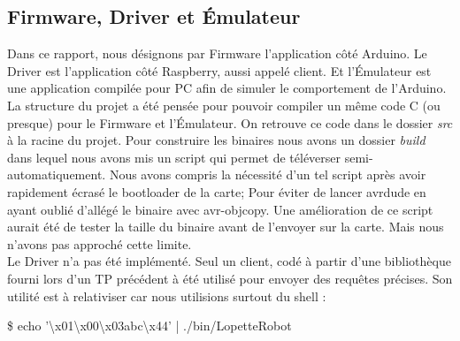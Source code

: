 \subsection{Firmware, Driver et Émulateur}
Dans ce rapport, nous désignons par Firmware l'application côté Arduino. 
Le Driver est l'application côté Raspberry, aussi appelé client. Et l'Émulateur
est une application compilée pour PC afin de simuler le comportement de
l'Arduino.\\

La structure du projet a été pensée pour pouvoir compiler un même code C
(ou presque) pour le Firmware et l'Émulateur. On retrouve ce code dans le
dossier \textit{src} à la racine du projet. Pour construire les binaires nous avons 
un dossier \textit{build} dans lequel nous avons mis un script qui permet de 
téléverser semi-automatiquement. Nous avons
compris la nécessité d'un tel script après avoir rapidement écrasé le bootloader
de la carte; Pour éviter de lancer avrdude en ayant oublié d'allégé le binaire
avec avr-objcopy. Une amélioration de ce script aurait été de tester la taille 
du binaire avant de l'envoyer sur la carte. Mais nous n'avons pas approché
cette limite.\\

Le Driver n'a pas été implémenté. Seul un client, codé à partir d'une bibliothèque
fourni lors d'un TP précédent à été utilisé pour envoyer des requêtes précises.
Son utilité est à relativiser car nous utilisions surtout du shell :
\begin{center}
  \$ echo '\textbackslash x01\textbackslash x00\textbackslash x03abc\textbackslash x44' | ./bin/LopetteRobot
\end{center}


